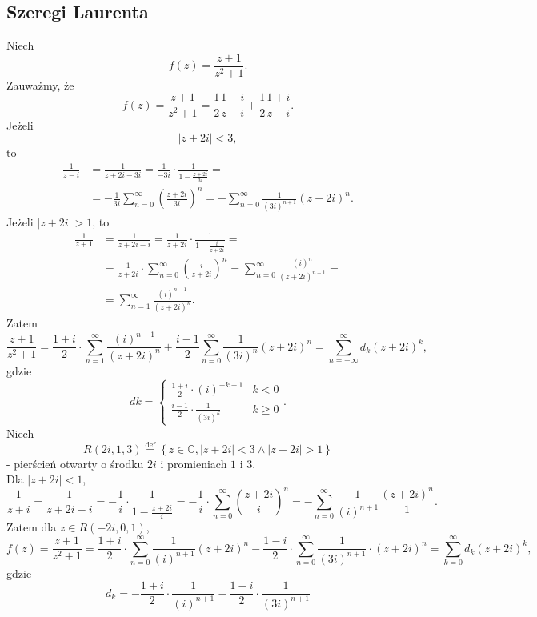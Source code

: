 \documentclass[../main.tex]{subfiles}
\begin{document}
\subsection{Szeregi Laurenta}
\begin{przyklad}
    Niech
    \[
        f(z) = \frac{z+1}{z^2 + 1}
    .\]
Zauważmy, że
\[
    f(z) = \frac{z+1}{z^2 + 1} = \frac{1}{2}\frac{1-i}{z - i} + \frac{1}{2}\frac{1+i}{z+i}
.\]
Jeżeli
\[
\left| z+2i \right| < 3
,\]
to
\begin{align*}
    \frac{1}{z-i} &= \frac{1}{z + 2i - 3i} = \frac{1}{-3i}\cdot \frac{1}{1-\frac{z+2i}{3i}} =\\
    &= -\frac{1}{3i}\sum_{n=0}^{\infty} \left( \frac{z+2i}{3i} \right) ^{n} = - \sum_{n=0}^{\infty} \frac{1}{(3i)^{n+1}}\left( z+2i \right)^n
.\end{align*}
Jeżeli $|z+2i| > 1$, to
\begin{align*}
    \frac{1}{z+1} &= \frac{1}{z + 2i - i} = \frac{1}{z+2i}\cdot \frac{1}{1- \frac{i}{z+2i}} =\\
    &= \frac{1}{z+2i} \cdot \sum_{n=0}^{\infty} \left( \frac{i}{z+2i} \right) ^n = \sum_{n=0}^{\infty} \frac{(i)^n}{(z+2i)^{n+1}} =\\
    &=\sum_{n=1}^{\infty} \frac{(i)^{n-1}}{(z+2i)^n}
.\end{align*}
Zatem
\[
    \frac{z+1}{z^2 + 1} = \frac{1+i}{2} \cdot \sum_{n=1}^{\infty} \frac{(i)^{n-1}}{(z+2i)^n} + \frac{i-1}{2} \sum_{n=0}^{\infty} \frac{1}{(3i)^n}(z+2i)^n = \sum_{n=-\infty}^{\infty} d_k (z+2i)^k
,\]
gdzie
\[
dk = \begin{cases}
    \frac{1+i}{2}\cdot (i)^{-k-1} & k <0 \\
    \frac{i - 1}{2}\cdot \frac{1}{(3i)^{k}} & k \ge 0
\end{cases}
.\]
Niech
    \[
        R(2i, 1, 3) \overset{\text{def}}{=} \left\{ z\in\mathbb{C}, |z+2i| < 3 \land |z + 2i| > 1 \right\}
    \]
    - pierścień otwarty o środku $2i$ i promieniach $1$ i $3$.\\
    Dla $|z+2i| < 1$,
     \[
         \frac{1}{z+i} = \frac{1}{z+2i-i} = -\frac{1}{i} \cdot \frac{1}{1 - \frac{z+2i}{i}} = -\frac{1}{i} \cdot \sum_{n=0}^{\infty} \left(\frac{z+2i}{i}\right)^n = -\sum_{n=0}^{\infty} \frac{1}{(i)^{n+1}}\frac{(z+2i)^n}{1}
    .\]
Zatem dla $z\in R(-2i, 0, 1)$,
\[
    f(z) = \frac{z+1}{z^2 + 1} = \frac{1+i}{2}\cdot \sum_{n=0}^{\infty} \frac{1}{(i)^{n+1}}(z+2i)^n - \frac{1-i}{2}\cdot \sum_{n=0}^{\infty} \frac{1}{(3i)^{n+1}}\cdot (z+2i)^n = \sum_{k = 0}^{\infty}d_k \left( z+2i \right) ^k
,\]
gdzie
\[
    d_k = -\frac{1+i}{2}\cdot \frac{1}{(i)^{n+1}} - \frac{1-i}{2}\cdot \frac{1}{(3i)^{n+1}}
\]
\end{przyklad}
\end{document}
